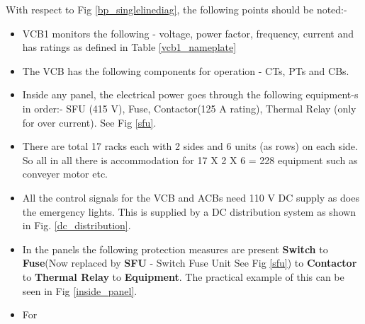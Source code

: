 \documentclass{report}
\begin{document}
	With respect to Fig \ref{bp_singlelinediag}, the following points should be noted:-
	\begin{itemize}
		\item VCB1 monitors the following - voltage, power factor, frequency, current and has ratings as defined in Table \ref{vcb1_nameplate}
		\item The VCB has the following components for operation - CTs, PTs and CBs.
		\item Inside any panel, the electrical power goes through the following equipment-s in order:- SFU (415 V), Fuse, Contactor(125 A rating), Thermal Relay (only for over current). See Fig \ref{sfu}.
		\item There are total 17 racks each with 2 sides and 6 units (as rows) on each side. So all in all there is accommodation for 17 X 2 X 6 = 228 equipment such as conveyer motor etc.
		\item All the control signals for the VCB and ACBs need 110 V DC supply as does the emergency lights. This is supplied by a DC distribution system as shown in Fig. \ref{dc_distribution}.
	\end{itemize}
	\begin{itemize}
		\item In the panels the following protection measures are present \textbf{Switch} to \textbf{Fuse}(Now replaced by \textbf{SFU} - Switch Fuse Unit See Fig \ref{sfu}) to \textbf{Contactor} to \textbf{Thermal Relay} to \textbf{Equipment}. The practical example of this can be seen in Fig \ref{inside_panel}.
		\item For 
	\end{itemize}
\end{document}

